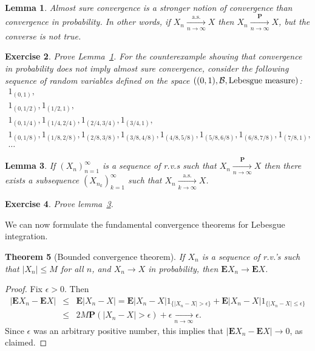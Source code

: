 \documentclass[12pt]{article}
\newtheorem{thm}{Theorem}[section]
\newtheorem{lemma}[thm]{Lemma}
\newtheorem{exercise}[thm]{Exercise}
\newcommand{\prob}{\mathbf{P}}
\newcommand{\expec}{\mathbf{E}}
\theoremstyle{example}
\begin{document}
%
%
\begin{lemma} Almost sure convergence is a stronger notion of convergence than convergence in probability. In other words, if $X_n\xrightarrow[n\to\infty]{\textrm{a.s.}} X$ then $X_n\xrightarrow[n\to\infty]{\prob} X$, but the converse is not true.
\label{lem-convergence-types}
\end{lemma}

\begin{exercise} Prove Lemma~\ref{lem-convergence-types}. For the counterexample showing that convergence in probability does not imply almost sure convergence, consider the following sequence of random variables defined on the space $((0,1),{\cal B}, \textrm{Lebesgue measure})$:
$$
\begin{array}{l}
1_{(0,1)}, \\
 1_{(0,1/2)},  1_{(1/2,1)}, \\
 1_{(0,1/4)},  1_{(1/4,2/4)},  1_{(2/4,3/4)},  1_{(3/4,1)},  \\
 1_{(0,1/8)},  1_{(1/8,2/8)},  1_{(2/8,3/8)},  1_{(3/8,4/8)}, 
 1_{(4/8,5/8)},  1_{(5/8,6/8)},  1_{(6/8,7/8)},  1_{(7/8,1)}, \\ \ldots
\end{array}
$$
\end{exercise}

%
%
\begin{lemma} \label{lem:prob-as-subseq}
If $(X_n)_{n=1}^\infty$ is a sequence of r.v.s such that $X_n \xrightarrow[n\to\infty]{\prob} X$ then there exists a subsequence $(X_{n_k})_{k=1}^\infty$ such that $X_n \xrightarrow[k\to\infty]{\textrm{a.s.}} X$.
\end{lemma}

\begin{exercise} Prove lemma~\ref{lem:prob-as-subseq}.
\end{exercise}

We can now formulate the fundamental convergence theorems for Lebesgue integration.

\begin{thm}[Bounded convergence theorem] If $X_n$ is a sequence of r.v.'s such that $|X_n|\le M$ for all $n$, and $X_n\to X$ in probability, then $\expec X_n \to \expec X$.
\end{thm}

\begin{proof}
Fix $\epsilon>0$. Then
\begin{eqnarray*}
|\expec X_n - \expec X| &\le& \expec |X_n - X| = \expec |X_n - X|1_{\{|X_n-X|>\epsilon\}}
+ \expec |X_n - X|1_{\{|X_n-X|\le \epsilon\}}
\\ &\le& 2M \prob(|X_n-X|>\epsilon) + \epsilon\xrightarrow[n\to\infty]{} \epsilon.
\end{eqnarray*}
Since $\epsilon$ was an arbitrary positive number, this implies that $|\expec X_n-\expec X|\to 0$, as claimed.
\end{proof}
\end{document}
